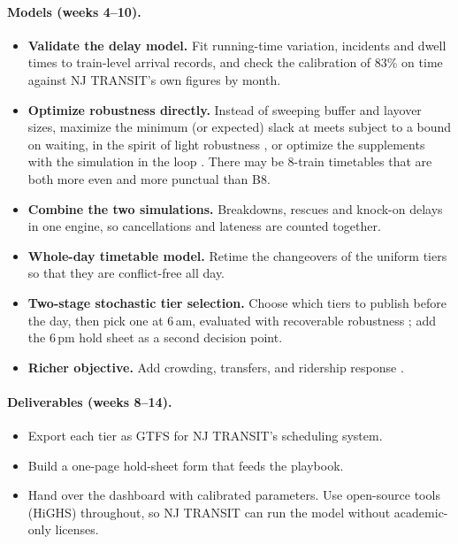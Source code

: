 \documentclass[11pt]{article}
\begin{document}
\paragraph{Models (weeks 4--10).}
\begin{itemize}
\item \textbf{Validate the delay model.} Fit running-time variation, incidents and dwell times to train-level arrival records, and check the calibration of 83\% on time against NJ TRANSIT's own figures by month.
\item \textbf{Optimize robustness directly.} Instead of sweeping buffer and layover sizes, maximize the minimum (or expected) slack at meets subject to a bound on waiting, in the spirit of light robustness \citep{fischetti2009light}, or optimize the supplements with the simulation in the loop \citep{kroon2008stochastic}. There may be 8-train timetables that are both more even and more punctual than B8.
\item \textbf{Combine the two simulations.} Breakdowns, rescues and knock-on delays in one engine, so cancellations and lateness are counted together.
\item \textbf{Whole-day timetable model.} Retime the changeovers of the uniform tiers so that they are conflict-free all day.
\item \textbf{Two-stage stochastic tier selection.} Choose which tiers to publish before the day, then pick one at 6\,am, evaluated with recoverable robustness \citep{liebchen2009concept}; add the 6\,pm hold sheet as a second decision point.
\item \textbf{Richer objective.} Add crowding, transfers, and ridership response \citep{evans2004tcrp95ch9}.
\end{itemize}
\paragraph{Deliverables (weeks 8--14).}
\begin{itemize}
\item Export each tier as GTFS for NJ TRANSIT's scheduling system.
\item Build a one-page hold-sheet form that feeds the playbook.
\item Hand over the dashboard with calibrated parameters. Use open-source tools (HiGHS) throughout, so NJ TRANSIT can run the model without academic-only licenses.
\end{itemize}



\end{document}
